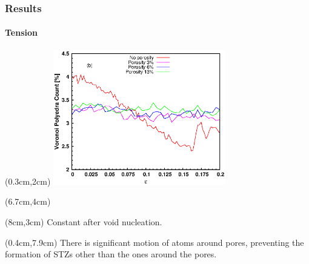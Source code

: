\begin{frame}
    \frametitle{Results}
    \framesubtitle{Tension}
    \begin{textblock*}{7.5cm}(0.3cm,2cm) %
        \includegraphics[width=7.5cm]{Presentacion_PANACM_Franco/tipe3_strain_tens.eps}
    \end{textblock*}
    \begin{textblock*}{4.2cm}(6.7cm,4cm) %
    \end{textblock*}
    \begin{textblock*}{5cm}(8cm,3cm) %
        Constant after void nucleation.
    \end{textblock*}
    \begin{textblock*}{12cm}(0.4cm,7.9cm) %
        There is significant motion of atoms around pores, preventing the formation of STZs other than the ones around the pores.
    \end{textblock*}
\end{frame}


